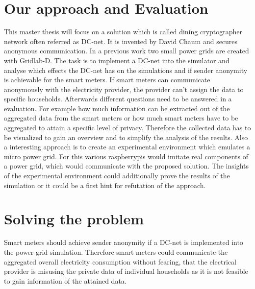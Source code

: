 \documentclass[english,sigconf,11pt]{acmart}
\begin{document}
\section{Our approach and Evaluation}
This master thesis will focus on a solution which is called dining cryptographer network often referred as DC-net. It is invented by David Chaum and secures anonymous communication. 
In a previous work two small power grids are created with Gridlab-D. The task is to implement a DC-net into the simulator and analyse which effects the DC-net has on the simulations and if sender anonymity is achievable for the smart meters. If smart meters can communicate anonymously with the electricity provider, the provider can't assign the data to specific households.
Afterwards different questions need to be answered in a evaluation. For example how much information can be extracted out of the aggregated data from the smart meters or how much smart meters have to be aggregated to attain a specific level of privacy.
Therefore the collected data has to be visualized to gain an overview and to  simplify the analysis of the results.
Also a interesting approach is to create an experimental environment which emulates a micro power grid. For this various raspberrypis would imitate real components of a power grid, which would communicate with the proposed solution. The insights of the experimental environment could additionally prove the results of the simulation or it could be a first hint for refutation of the approach. 
\section{Solving the problem}
Smart meters should achieve sender anonymity if a DC-net is implemented into the power grid simulation. Therefore smart meters could communicate the aggregated overall electricity consumption without fearing, that the electrical provider is misusing the private data of individual households as it is not feasible to gain information of the attained data.
\end{document}
